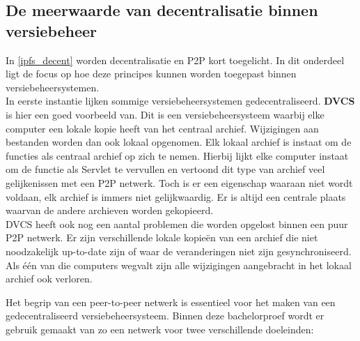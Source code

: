 \subsection{De meerwaarde van decentralisatie binnen versiebeheer}
In \ref{ipfs_decent} worden decentralisatie en P2P kort toegelicht. In dit onderdeel ligt de focus op hoe deze principes kunnen worden toegepast binnen versiebeheersystemen.\\

In eerste instantie lijken sommige versiebeheersystemen gedecentraliseerd. \textbf{DVCS} is hier een goed voorbeeld van. Dit is een versiebeheersysteem waarbij elke computer een lokale kopie heeft van het centraal archief. Wijzigingen aan bestanden worden dan ook lokaal opgenomen. Elk lokaal archief is instaat om de functies als centraal archief op zich te nemen. Hierbij lijkt elke computer instaat om de functie als Servlet te vervullen en vertoond dit type van archief veel gelijkenissen met een P2P netwerk. Toch is er een eigenschap waaraan niet wordt voldaan, elk archief is immers niet gelijkwaardig. Er is altijd een centrale plaats waarvan de andere archieven worden gekopieerd.\\

DVCS heeft ook nog een aantal problemen die worden opgelost binnen een puur P2P netwerk. Er zijn verschillende lokale kopieën van een archief die niet noodzakelijk up-to-date zijn of waar de veranderingen niet zijn gesynchroniseerd. Als één van die computers wegvalt zijn alle wijzigingen aangebracht in het lokaal archief ook verloren. 

Het begrip van een peer-to-peer netwerk is essentieel voor het maken van een gedecentraliseerd versiebeheersysteem. Binnen deze bachelorproef wordt er gebruik gemaakt van zo een netwerk voor twee verschillende doeleinden:

